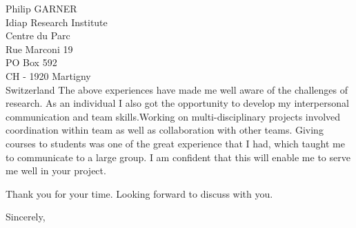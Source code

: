 \documentclass[
	pagenumber=false, %
	parskip=half, %
	fromalign=right, %
	foldmarks=true, %
	addrfield=true %
	]{scrlttr2}
\begin{document}
\begin{letter}{Philip GARNER \\ Idiap Research Institute\\ Centre du Parc \\ Rue Marconi 19  \\ PO Box 592 \\CH - 1920 Martigny \\Switzerland}
 The above experiences have made me well aware of the challenges of research. As an individual I also got the opportunity to develop my interpersonal communication and team 		
skills.Working on multi-disciplinary projects involved coordination within  team as well as collaboration with other teams. Giving courses to students was one of the great experience that I had, which taught me to communicate to a large group. I am confident that this will enable me to serve me well in your project.

Thank you for your time. Looking forward to discuss with you.


\closing{Sincerely,}



\end{letter}
 
\end{document}
